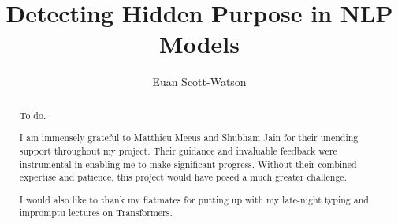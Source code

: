 \documentclass[a4paper, twoside]{report}
\title{Detecting Hidden Purpose in NLP Models}
\author{Euan Scott-Watson}
\begin{document}


\begin{abstract}
    To do.
\end{abstract}

\renewcommand{\abstractname}{Acknowledgements}
\begin{abstract}
    I am immensely grateful to Matthieu Meeus and Shubham Jain for their unending support throughout my project. Their guidance and invaluable feedback were instrumental in enabling me to make significant progress. Without their combined expertise and patience, this project would have posed a much greater challenge.

    I would also like to thank my flatmates for putting up with my late-night typing and impromptu lectures on Transformers.
\end{abstract}

\tableofcontents












\end{document}
